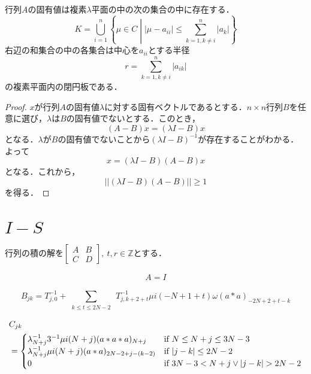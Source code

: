 \documentclass[11pt,a4paper,titlepage]{jsreport}
\theoremstyle{definition}
\begin{document}
\dfn[ゲルシュゴリンの定理]
行列$A$の固有値は複素$\lambda$平面の中の次の集合の中に存在する．
\begin{equation}
  K=\bigcup_{i=1}^{n} \left\{ \mu \in C \middle| |\mu - a_{ii}| \leq \sum_{k=1,k\neq i}^{n} |a_k| \right\}
\end{equation}
右辺の和集合の中の各集合は中心を$a_{ii}$とする半径
\begin{equation}
  r=\sum_{k=1,k\neq i}^{n} |a_{ik}|
\end{equation}
の複素平面内の閉円板である．

\begin{proof}
  $x$が行列$A$の固有値$\lambda$に対する固有ベクトルであるとする．$n \times n$行列$B$を任意に選び，$\lambda$は$B$の固有値でないとする．このとき，
  \begin{equation}
    (A-B)x = (\lambda I - B)x
  \end{equation}
  となる．$\lambda$が$B$の固有値でないことから$(\lambda I - B)^{-1}$が存在することがわかる．よって
  \begin{equation}
    x=(\lambda I - B)(A-B)x
  \end{equation}
  となる．これから，
  \begin{equation}
    || (\lambda I - B)(A-B) || \geq 1
  \end{equation}
  を得る．

\end{proof}

\section*{$I-S$}
行列の積の解を$\begin{bmatrix} A & B \\ C & D\end{bmatrix},\ t,r\in \mathbb{Z}$とする．

\begin{equation}
  \begin{split}
    A = I
  \end{split}
\end{equation}

\begin{equation}
    B_{jk} = T_{j,0}^{-1}+\sum_{\substack{k \leq t \leq 2N-2}} \, T_{j,k+2+t}^{-1} \mu i (- N + 1 + t) \omega (a*a)_{-2N+2+t-k}
\end{equation}

\begin{equation}
  \begin{split}
    &C_{jk} \\
    &=\begin{cases}
      \lambda_{N+j}^{-1} 3^{-1} \mu i (N+j) (a*a*a)_{N+j} & \text{if $N \leq N+j \leq 3N-3$} \\
      \lambda_{N+j}^{-1} \mu i (N+j) (a*a)_{2N-2 + j - (k-2)} & \text{if $ |j - k| \leq 2N-2$} \\
      0 & \text{if $3N-3 < N+j \lor |j - k| > 2N-2$}
    \end{cases}
  \end{split}
\end{equation}
\end{document}
